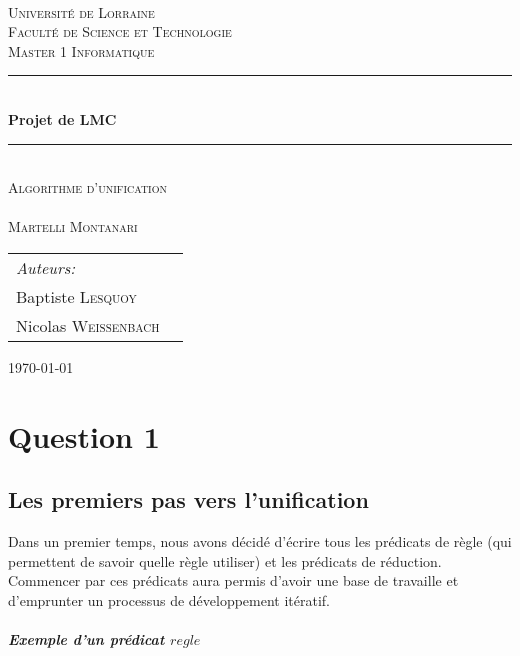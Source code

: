 \documentclass[10pt,a4paper]{report}
\newcommand{\HRule}{\rule{\linewidth}{1mm}}
\begin{document}
  \begin{titlepage}
    \begin{center}
      ~\\[4cm]
      \textsc{\LARGE Université de Lorraine}\\[1.5cm]
      \textsc{\Large Faculté de Science et Technologie}\\[0.5cm]
      \textsc{\Large Master 1 Informatique}\\[0.5cm]
      \HRule \\[0.4cm]
      { \huge \bfseries Projet de LMC \\[0.4cm] }
      \HRule \\[1cm]
     \textsc{\LARGE Algorithme d'unification \\ ~ \\ Martelli Montanari }\\[1cm]
      \begin{tabular*}{\textwidth}{@{}l@{\extracolsep{\fill}}r@{}}
	\emph{Auteurs:}\\
	Baptiste \textsc{Lesquoy} \\
	Nicolas \textsc{Weissenbach}\\
      \end{tabular*}
      \vfill
      {\large \today}
    \end{center}
  \end{titlepage}

\chapter*{Question 1}

\section*{Les premiers pas vers l'unification}
Dans un premier temps, nous avons décidé d'écrire tous les prédicats de règle (qui permettent de savoir quelle règle utiliser) et les prédicats de réduction. Commencer par ces prédicats aura permis d'avoir une base de travaille et d'emprunter un processus de développement itératif.

\paragraph{Exemple d'un prédicat $regle$} ~\\
\end{document}
